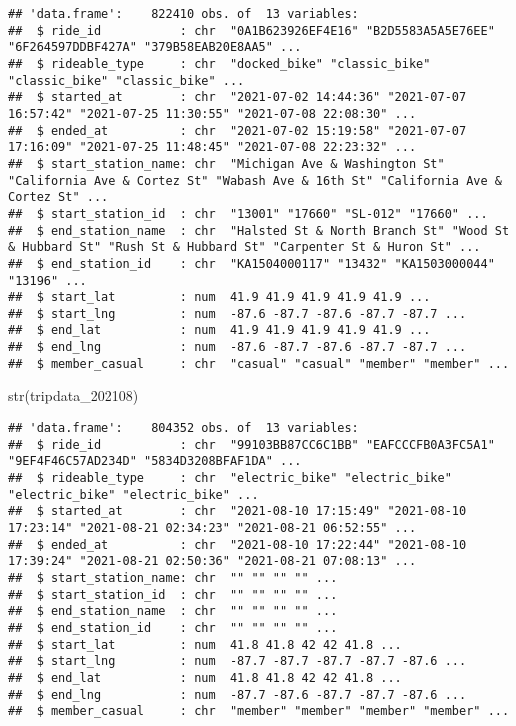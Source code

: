 \documentclass[
]{article}
\newenvironment{Shaded}{\begin{snugshade}}{\end{snugshade}}
\newcommand{\FunctionTok}[1]{\textcolor[rgb]{0.00,0.00,0.00}{#1}}
\newcommand{\NormalTok}[1]{#1}
\begin{document}
\begin{verbatim}
## 'data.frame':    822410 obs. of  13 variables:
##  $ ride_id           : chr  "0A1B623926EF4E16" "B2D5583A5A5E76EE" "6F264597DDBF427A" "379B58EAB20E8AA5" ...
##  $ rideable_type     : chr  "docked_bike" "classic_bike" "classic_bike" "classic_bike" ...
##  $ started_at        : chr  "2021-07-02 14:44:36" "2021-07-07 16:57:42" "2021-07-25 11:30:55" "2021-07-08 22:08:30" ...
##  $ ended_at          : chr  "2021-07-02 15:19:58" "2021-07-07 17:16:09" "2021-07-25 11:48:45" "2021-07-08 22:23:32" ...
##  $ start_station_name: chr  "Michigan Ave & Washington St" "California Ave & Cortez St" "Wabash Ave & 16th St" "California Ave & Cortez St" ...
##  $ start_station_id  : chr  "13001" "17660" "SL-012" "17660" ...
##  $ end_station_name  : chr  "Halsted St & North Branch St" "Wood St & Hubbard St" "Rush St & Hubbard St" "Carpenter St & Huron St" ...
##  $ end_station_id    : chr  "KA1504000117" "13432" "KA1503000044" "13196" ...
##  $ start_lat         : num  41.9 41.9 41.9 41.9 41.9 ...
##  $ start_lng         : num  -87.6 -87.7 -87.6 -87.7 -87.7 ...
##  $ end_lat           : num  41.9 41.9 41.9 41.9 41.9 ...
##  $ end_lng           : num  -87.6 -87.7 -87.6 -87.7 -87.7 ...
##  $ member_casual     : chr  "casual" "casual" "member" "member" ...
\end{verbatim}

\begin{Shaded}
\begin{Highlighting}[]
\FunctionTok{str}\NormalTok{(tripdata\_202108)}
\end{Highlighting}
\end{Shaded}

\begin{verbatim}
## 'data.frame':    804352 obs. of  13 variables:
##  $ ride_id           : chr  "99103BB87CC6C1BB" "EAFCCCFB0A3FC5A1" "9EF4F46C57AD234D" "5834D3208BFAF1DA" ...
##  $ rideable_type     : chr  "electric_bike" "electric_bike" "electric_bike" "electric_bike" ...
##  $ started_at        : chr  "2021-08-10 17:15:49" "2021-08-10 17:23:14" "2021-08-21 02:34:23" "2021-08-21 06:52:55" ...
##  $ ended_at          : chr  "2021-08-10 17:22:44" "2021-08-10 17:39:24" "2021-08-21 02:50:36" "2021-08-21 07:08:13" ...
##  $ start_station_name: chr  "" "" "" "" ...
##  $ start_station_id  : chr  "" "" "" "" ...
##  $ end_station_name  : chr  "" "" "" "" ...
##  $ end_station_id    : chr  "" "" "" "" ...
##  $ start_lat         : num  41.8 41.8 42 42 41.8 ...
##  $ start_lng         : num  -87.7 -87.7 -87.7 -87.7 -87.6 ...
##  $ end_lat           : num  41.8 41.8 42 42 41.8 ...
##  $ end_lng           : num  -87.7 -87.6 -87.7 -87.7 -87.6 ...
##  $ member_casual     : chr  "member" "member" "member" "member" ...
\end{verbatim}
\end{document}
